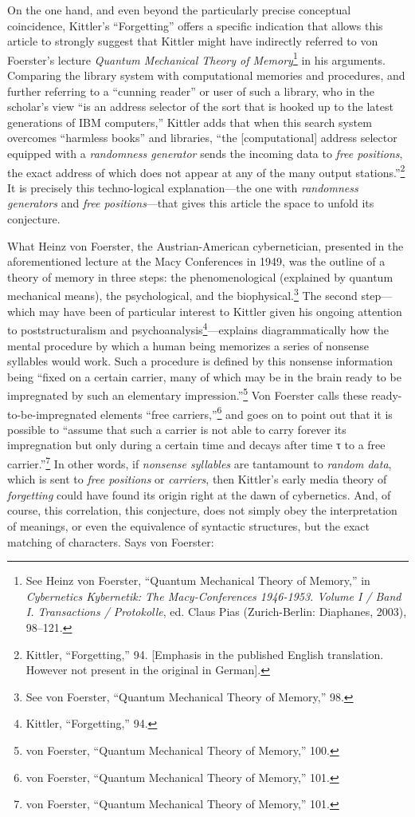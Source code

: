 \documentclass{tufte-handout}
\begin{document}
On the one hand, and even beyond the particularly precise conceptual
coincidence, Kittler's ``Forgetting'' offers a specific indication that
allows this article to strongly suggest that Kittler might have
indirectly referred to von Foerster's lecture \emph{Quantum Mechanical
Theory of Memory}\footnote{See Heinz von Foerster, ``Quantum Mechanical
  Theory of Memory,'' in \emph{Cybernetics \textbar{} Kybernetik: The
  Macy-Conferences 1946-1953. Volume I / Band I. Transactions /
  Protokolle}, ed. Claus Pias (Zurich-Berlin: Diaphanes, 2003), 98--121.}
in his arguments. Comparing the library system with computational
memories and procedures, and further referring to a ``cunning reader''
or user of such a library, who in the scholar's view ``is an address
selector of the sort that is hooked up to the latest generations of IBM
computers,'' Kittler adds that when this search system overcomes
``harmless books'' and libraries, ``the {[}computational{]} address
selector equipped with a \emph{randomness generator} sends the incoming
data to \emph{free positions}, the exact address of which does not
appear at any of the many output stations.''\footnote{Kittler,
  ``Forgetting,'' 94. {[}Emphasis in the published English translation.
  However not present in the original in German{]}.} It is precisely
this techno-logical explanation---the one with \emph{randomness
generators} and \emph{free positions}---that gives this article the
space to unfold its conjecture.

What Heinz von Foerster, the Austrian-American cybernetician, presented
in the aforementioned lecture at the Macy Conferences in 1949, was the
outline of a theory of memory in three steps: the phenomenological
(explained by quantum mechanical means), the psychological, and the
biophysical.\footnote{See von Foerster, ``Quantum Mechanical Theory of
  Memory,'' 98.} The second step---which may have been of particular
interest to Kittler given his ongoing attention to poststructuralism and
psychoanalysis\footnote{Kittler, ``Forgetting,'' 94.}---explains
diagrammatically how the mental procedure by which a human being
memorizes a series of nonsense syllables would work. Such a procedure is
defined by this nonsense information being ``fixed on a certain carrier,
many of which may be in the brain ready to be impregnated by such an
elementary impression.''\footnote{von Foerster, ``Quantum Mechanical
  Theory of Memory,'' 100.} Von Foerster calls these
ready-to-be-impregnated elements ``free carriers,''\footnote{von
  Foerster, ``Quantum Mechanical Theory of Memory,'' 101.} and goes on
to point out that it is possible to ``assume that such a carrier is not
able to carry forever its impregnation but only during a certain time
and decays after time τ to a free carrier.''\footnote{von Foerster,
  ``Quantum Mechanical Theory of Memory,'' 101.} In other words, if
\emph{nonsense syllables} are tantamount to \emph{random data}, which is
sent to \emph{free positions} or \emph{carriers}, then Kittler's early
media theory of \emph{forgetting} could have found its origin right at
the dawn of cybernetics. And, of course, this correlation, this
conjecture, does not simply obey the interpretation of meanings, or even
the equivalence of syntactic structures, but the exact matching of
characters. Says von Foerster:
\end{document}
